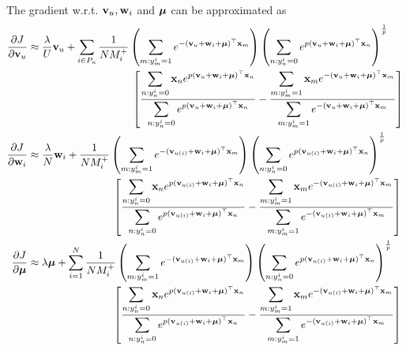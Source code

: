 The gradient w.r.t. $\mathbf{v}_u, \mathbf{w}_i$ and $\bm{\mu}$ can be approximated as 
\begin{equation*}
\begin{aligned}
\frac{\partial J}{\partial \bv_u}
&\approx \frac{\lambda}{U} \bv_u
  + \sum_{i \in P_u} \frac{1}{N M_i^+} 
    \left( \sum_{m: y_m^i = 1} e^{-(\bv_u + \w_i + \mubm)^\top \x_m} \right)
    \left( \sum_{n: y_n^i = 0} e^{p (\bv_u + \w_i + \mubm)^\top \x_n} \right)^\frac{1}{p} \\
& \hspace{9.8em} \left[ 
    \frac{ \displaystyle \sum_{n: y_n^i = 0} \x_n e^{p (\bv_u + \w_i + \mubm)^\top \x_n} }
         { \displaystyle \sum_{n: y_n^i = 0} e^{p (\bv_u + \w_i + \mubm)^\top \x_n} }
    - \frac{ \displaystyle \sum_{m: y_m^i = 1} \x_m e^{-(\bv_u + \w_i + \mubm)^\top \x_m} }
           { \displaystyle \sum_{m: y_m^i = 1} e^{-(\bv_u + \w_i + \mubm)^\top \x_m} } \right] \\
%
\frac{\partial J}{\partial \w_i}
&\approx \frac{\lambda}{N} \w_i
  + \frac{1}{N M_i^+} 
    \left( \sum_{m: y_m^i = 1} e^{-(\bv_{u(i)} + \w_i + \mubm)^\top \x_m} \right)
    \left( \sum_{n: y_n^i = 0} e^{p (\bv_{u(i)} + \w_i + \mubm)^\top \x_n} \right)^\frac{1}{p} \\
& \hspace{8em} \left[ 
    \frac{ \displaystyle \sum_{n: y_n^i = 0} \x_n e^{p (\bv_{u(i)} + \w_i + \mubm)^\top \x_n} }
         { \displaystyle \sum_{n: y_n^i = 0} e^{p (\bv_{u(i)} + \w_i + \mubm)^\top \x_n} }
    - \frac{ \displaystyle \sum_{m: y_m^i = 1} \x_m e^{-(\bv_{u(i)} + \w_i + \mubm)^\top \x_m} }
           { \displaystyle \sum_{m: y_m^i = 1} e^{-(\bv_{u(i)} + \w_i + \mubm)^\top \x_m} } \right] \\
%
\frac{\partial J}{\partial \mubm}
&\approx \lambda \mubm
  + \sum_{i=1}^N \frac{1}{N M_i^+} 
    \left( \sum_{m: y_m^i = 1} e^{-(\bv_{u(i)} + \w_i + \mubm)^\top \x_m} \right)
    \left( \sum_{n: y_n^i = 0} e^{p (\bv_{u(i)} + \w_i + \mubm)^\top \x_n} \right)^\frac{1}{p} \\
& \hspace{8em} \left[ 
    \frac{ \displaystyle \sum_{n: y_n^i = 0} \x_n e^{p (\bv_{u(i)} + \w_i + \mubm)^\top \x_n} }
         { \displaystyle \sum_{n: y_n^i = 0} e^{p (\bv_{u(i)} + \w_i + \mubm)^\top \x_n} }
    - \frac{ \displaystyle \sum_{m: y_m^i = 1} \x_m e^{-(\bv_{u(i)} + \w_i + \mubm)^\top \x_m} }
           { \displaystyle \sum_{m: y_m^i = 1} e^{-(\bv_{u(i)} + \w_i + \mubm)^\top \x_m} } \right]
\end{aligned}
\end{equation*}


